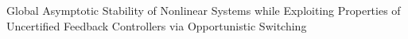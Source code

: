 Global Asymptotic
Stability of Nonlinear Systems while Exploiting Properties of Uncertified Feedback Controllers
via Opportunistic Switching%